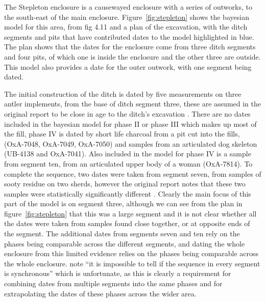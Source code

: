 The Stepleton enclosure is a causewayed enclosure with a series of outworks, to the south-east of the main enclosure. Figure~\ref{fig:stepleton} shows the bayesian model for this area, from fig 4.11 \citep[142]{Whittle:2011kl} and a plan of the excavation, with the ditch segments and pits that have contributed dates to the model highlighted in blue. The plan shows that the dates for the enclosure come from three ditch segments and four pits, of which one is inside the enclosure and the other three are outside. This model also provides a date for the outer outwork, with one segment being dated. 

The initial construction of the ditch is dated by five measurements on three antler implements, from the base of ditch segment three, these are assumed in the original report to be close in age to the ditch's excavation \citep[394]{Mercer:2008fk}. There are no dates included in the bayesian model for phase II or phase III which makes up most of the fill, phase IV is dated by short life charcoal from a pit cut into the fills, (OxA-7048, OxA-7049, OxA-7050) and samples from an articulated dog skeleton (UB-4138 and OxA-7041). Also included in the model for phase IV is a sample from segment ten, from an articulated upper body of a woman (OxA-7814). To complete the sequence, two dates were taken from segment seven, from samples of sooty residue on two sherds, however the original report notes that these two samples were statistically significantly different \citep[394]{Mercer:2008fk}. Clearly the main focus of this part of the model is on segment three, although we can see from the plan in figure~\ref{fig:stepleton} that this was a large segment and it is not clear whether all the dates were taken from samples found close together, or at opposite ends of the segment. The additional dates from segments seven and ten rely on the phases being comparable across the different segments, and dating the whole enclosure from this limited evidence relies on the phases being comparable across the whole enclosure. \citet[394]{Mercer:2008fk} note ``it is impossible to tell if the sequence in every segment is synchronous'' which is unfortunate, as this is clearly a requirement for combining dates from multiple segments into the same phases and for extrapolating the dates of these phases across the wider area.

